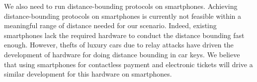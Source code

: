 We also need to run distance-bounding protocols on smartphones.
Achieving distance-bounding protocols on smartphones is currently not feasible 
within a meaningful range of distance needed for our scenario.
Indeed, existing smartphones lack the required hardware to conduct the distance bounding fast enough.
However, thefts of luxury cars due to relay attacks have driven the development 
of hardware for doing distance bounding in car keys.
We believe that using smartphones for contactless payment and electronic 
tickets will drive a similar development for this hardware on smartphones.



